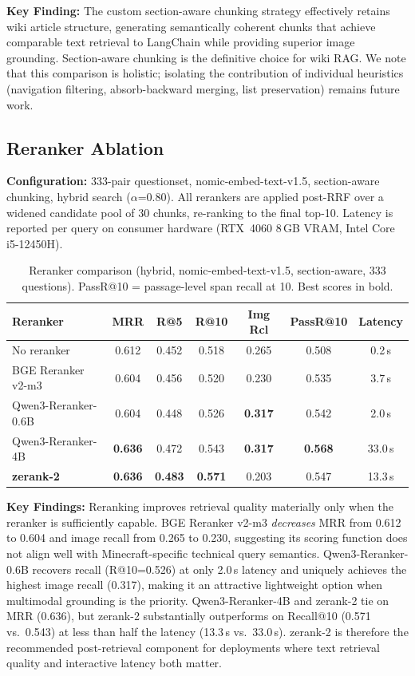 \documentclass[11pt,a4paper]{article}
\begin{document}
\textbf{Key Finding:} The custom section-aware chunking strategy effectively retains wiki article structure, generating semantically coherent chunks that achieve comparable text retrieval to LangChain while providing superior image grounding. Section-aware chunking is the definitive choice for wiki RAG. We note that this comparison is holistic; isolating the contribution of individual heuristics (navigation filtering, absorb-backward merging, list preservation) remains future work.

\subsection{Reranker Ablation}
\label{sec:reranker-axis}

\textbf{Configuration:} 333-pair questionset, nomic-embed-text-v1.5, section-aware chunking, hybrid search ($\alpha$=0.80). All rerankers are applied post-RRF over a widened candidate pool of 30 chunks, re-ranking to the final top-10. Latency is reported per query on consumer hardware (RTX~4060 8\,GB VRAM, Intel Core i5-12450H).

\begin{table}[h]
\caption{Reranker comparison (hybrid, nomic-embed-text-v1.5, section-aware, 333 questions). PassR@10 = passage-level span recall at 10. Best scores in bold.}
\label{tab:reranker}
\centering
\begin{tabular}{lcccccc}
\toprule
\textbf{Reranker} & \textbf{MRR} & \textbf{R@5} & \textbf{R@10} & \textbf{Img Rcl} & \textbf{PassR@10} & \textbf{Latency} \\
\midrule
No reranker         & 0.612 & 0.452 & 0.518 & 0.265 & 0.508 & 0.2\,s \\
BGE Reranker v2-m3  & 0.604 & 0.456 & 0.520 & 0.230 & 0.535 & 3.7\,s \\
Qwen3-Reranker-0.6B & 0.604 & 0.448 & 0.526 & \textbf{0.317} & 0.542 & 2.0\,s \\
Qwen3-Reranker-4B   & \textbf{0.636} & 0.472 & 0.543 & \textbf{0.317} & \textbf{0.568} & 33.0\,s \\
\textbf{zerank-2}   & \textbf{0.636} & \textbf{0.483} & \textbf{0.571} & 0.203 & 0.547 & 13.3\,s \\
\bottomrule
\end{tabular}
\end{table}

\textbf{Key Findings:} Reranking improves retrieval quality materially only when the reranker is sufficiently capable. BGE Reranker v2-m3 \textit{decreases} MRR from 0.612 to 0.604 and image recall from 0.265 to 0.230, suggesting its scoring function does not align well with Minecraft-specific technical query semantics. Qwen3-Reranker-0.6B recovers recall (R@10=0.526) at only 2.0\,s latency and uniquely achieves the highest image recall (0.317), making it an attractive lightweight option when multimodal grounding is the priority. Qwen3-Reranker-4B and zerank-2 tie on MRR (0.636), but zerank-2 substantially outperforms on Recall@10 (0.571 vs.\ 0.543) at less than half the latency (13.3\,s vs.\ 33.0\,s). zerank-2 is therefore the recommended post-retrieval component for deployments where text retrieval quality and interactive latency both matter.
\end{document}
